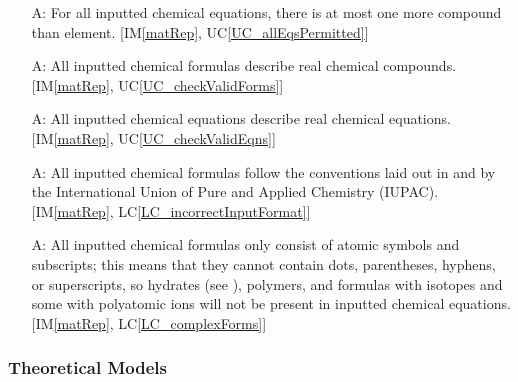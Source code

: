 \documentclass[12pt]{article}
\newcounter{assumpnum} %
\newcommand{\imref}[1]{IM\ref{#1}}
\newcommand{\lcref}[1]{LC\ref{#1}}
\newcommand{\ucref}[1]{UC\ref{#1}}
\begin{document}
\begin{itemize}

  \item[A\refstepcounter{assumpnum}\theassumpnum \label{A_elemCompDiff}:]
    For all inputted chemical equations, there is at most one more compound than
    element. 
    [\imref{matRep}, \ucref{UC_allEqsPermitted}]

  \item[A\refstepcounter{assumpnum}\theassumpnum \label{A_validForms}:]
    All inputted chemical formulas describe real chemical compounds.
      [\imref{matRep}, \ucref{UC_checkValidForms}]

  \item[A\refstepcounter{assumpnum}\theassumpnum \label{A_validEqns}:]
    All inputted chemical equations describe real chemical equations.
      [\imref{matRep}, \ucref{UC_checkValidEqns}]

  \item[A\refstepcounter{assumpnum}\theassumpnum \label{A_correctInputFormat}:]
    All inputted chemical formulas follow the conventions laid out in
    \cite{international_union_of_pure_and_applied_chemistry_nomenclature_2005}
    and \cite{international_union_of_pure_and_applied_chemistry_nomenclature_2013}
    by the International Union of Pure and Applied Chemistry (IUPAC).
      [\imref{matRep}, \lcref{LC_incorrectInputFormat}]

  \item[A\refstepcounter{assumpnum}\theassumpnum \label{A_simpleForms}:]
    All inputted chemical formulas only consist of atomic symbols and
    subscripts; this means that they cannot contain dots, parentheses, hyphens,
    or superscripts, so hydrates (see ), polymers, and
    formulas with isotopes and some with polyatomic ions will not be present
    in inputted chemical equations. [\imref{matRep}, \lcref{LC_complexForms}]

\end{itemize}

\newpage

\subsubsection{Theoretical Models}\label{sec_theoretical}

\end{document}

